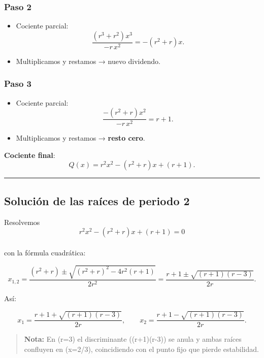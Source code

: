 \documentclass[
  11pt,
  a4paper,
  DIV=11,
  numbers=noendperiod]{scrreprt}
\providecommand{\tightlist}{%
  \setlength{\itemsep}{0pt}\setlength{\parskip}{0pt}}
\begin{document}
\subsubsection{Paso 2}\label{paso-2}

\begin{itemize}
\tightlist
\item
  Cociente parcial:\\
  \[
  \frac{(r^3+r^2)x^3}{-r\,x^2} = -(r^2+r)x.
  \]
\item
  Multiplicamos y restamos → nuevo dividendo.
\end{itemize}

\subsubsection{Paso 3}\label{paso-3}

\begin{itemize}
\tightlist
\item
  Cociente parcial:\\
  \[
  \frac{-(r^2+r)x^2}{-r\,x^2} = r+1.
  \]
\item
  Multiplicamos y restamos → \textbf{resto cero}.
\end{itemize}

\textbf{Cociente final}:\\
\[
Q(x) = r^2x^2 - (r^2+r)x + (r+1).
\]

\begin{center}\rule{0.5\linewidth}{0.5pt}\end{center}

\subsection{Solución de las raíces de periodo
2}\label{soluciuxf3n-de-las-rauxedces-de-periodo-2}

Resolvemos\\
\[
r^2x^2 - (r^2+r)x + (r+1) = 0
\]\\
con la fórmula cuadrática:

\[
x_{1,2}
= \frac{(r^2+r)\pm\sqrt{(r^2+r)^2 - 4r^2(r+1)}}{2r^2}
= \frac{r+1\pm\sqrt{(r+1)(r-3)}}{2r}.
\]

Así:

\[
x_1 = \frac{r+1 + \sqrt{(r+1)(r-3)}}{2r},
\qquad
x_2 = \frac{r+1 - \sqrt{(r+1)(r-3)}}{2r}.
\]

\begin{quote}
\textbf{Nota:} En (r=3) el discriminante ((r+1)(r-3)) se anula y ambas
raíces confluyen en (x=2/3), coincidiendo con el punto fijo que pierde
estabilidad.
\end{quote}
\end{document}
